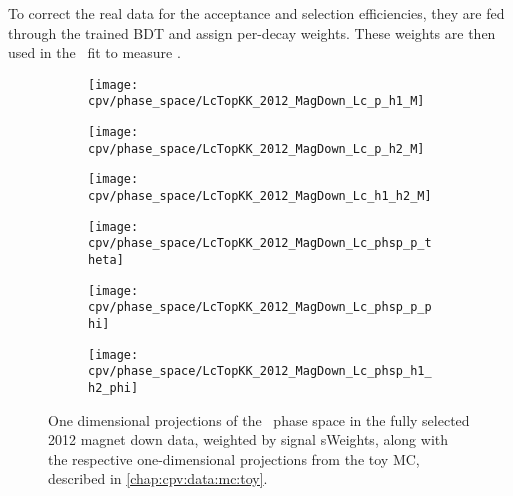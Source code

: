 To correct the real data for the acceptance and selection efficiencies, they 
are fed through the trained \ac{BDT} and assign per-decay weights.
These weights are then used in the \chisq\ fit to measure \ARaw.

\begin{figure}
  \centering
  \begin{subfigure}{0.4\textwidth}
    \texttt{[image: cpv/phase\_space/LcTopKK\_2012\_MagDown\_Lc\_p\_h1\_M]}
    \label{fig:cpv:phsp:data:pKK:msqphm}
  \end{subfigure}
  \begin{subfigure}{0.4\textwidth}
    \texttt{[image: cpv/phase\_space/LcTopKK\_2012\_MagDown\_Lc\_p\_h2\_M]}
    \label{fig:cpv:phsp:data:pKK:msqphp}
  \end{subfigure}
  \begin{subfigure}{0.4\textwidth}
    \texttt{[image: cpv/phase\_space/LcTopKK\_2012\_MagDown\_Lc\_h1\_h2\_M]}
    \label{fig:cpv:phsp:data:pKK:msqhh}
  \end{subfigure}
  \begin{subfigure}{0.4\textwidth}
    \texttt{[image: cpv/phase\_space/LcTopKK\_2012\_MagDown\_Lc\_phsp\_p\_theta]}
    \label{fig:cpv:phsp:data:pKK:proton_theta}
  \end{subfigure}
  \begin{subfigure}{0.4\textwidth}
    \texttt{[image: cpv/phase\_space/LcTopKK\_2012\_MagDown\_Lc\_phsp\_p\_phi]}
    \label{fig:cpv:phsp:data:pKK:proton_phi}
  \end{subfigure}
  \begin{subfigure}{0.4\textwidth}
    \texttt{[image: cpv/phase\_space/LcTopKK\_2012\_MagDown\_Lc\_phsp\_h1\_h2\_phi]}
    \label{fig:cpv:phsp:data:pKK:h1_h2_phi}
  \end{subfigure}
  \caption{%
    One dimensional projections of the \LcTopKK\ phase space in the fully 
    selected 2012 magnet down data, weighted by signal sWeights, along with the 
    respective one-dimensional projections from the toy \ac{MC}, described in 
    \cref{chap:cpv:data:mc:toy}.
  }
  \label{fig:cpv:phsp:data_1D:pKK}
\end{figure}

